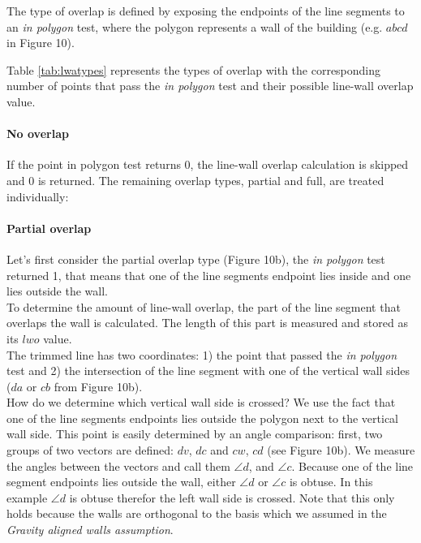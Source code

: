 
	The type of overlap is defined by exposing the endpoints of the line
	segments to an \emph{in polygon} test, where the polygon represents a 
	wall of the building (e.g. $abcd$ in Figure 10).

	Table \ref{tab:lwatypes} represents the types of overlap with the corresponding number of points
	that pass the \emph{in polygon} test and their possible line-wall overlap
	value.\\ 


	\paragraph{No overlap}
	If the point in polygon test returns 0, the line-wall overlap calculation
	is skipped and 0 is returned. The remaining overlap types, partial and full,
	are treated individually:\\


	\paragraph{Partial overlap}
	Let's first consider the partial overlap type (Figure 10b), the \emph{in polygon} test
	returned 1, that means that one of the line segments endpoint lies inside
	and one lies outside the wall.\\
	To determine the amount of line-wall overlap, the part of the line segment
	that overlaps the wall is calculated. The length of this part is measured
	and stored as its $lwo$ value.\\
	The trimmed line has two coordinates: 1) the point that passed
	the \emph{in polygon} test and 2) the intersection of the line
	segment with one of the vertical wall sides ($da$ or $cb$ from Figure 10b).\\
	How do we determine which vertical wall side is crossed?
	We use the fact that one of the line segments endpoints lies outside the
	polygon next to the vertical wall side.
 	This point is easily determined by an angle comparison:
	first, two groups of two vectors are defined: $dv$, $dc$ and $cw$, $cd$ (see Figure 10b).
	We measure the angles between the vectors and call them $\angle d$, and
	$\angle c$.  Because one of the line segment endpoints lies outside
	the wall, either $\angle d$ or $\angle c$ is obtuse. In this example $\angle
	d$ is obtuse therefor the left wall side is crossed.
	Note that this only holds because the walls are orthogonal to the basis
	which we assumed in the \emph{Gravity aligned walls assumption}.\\

